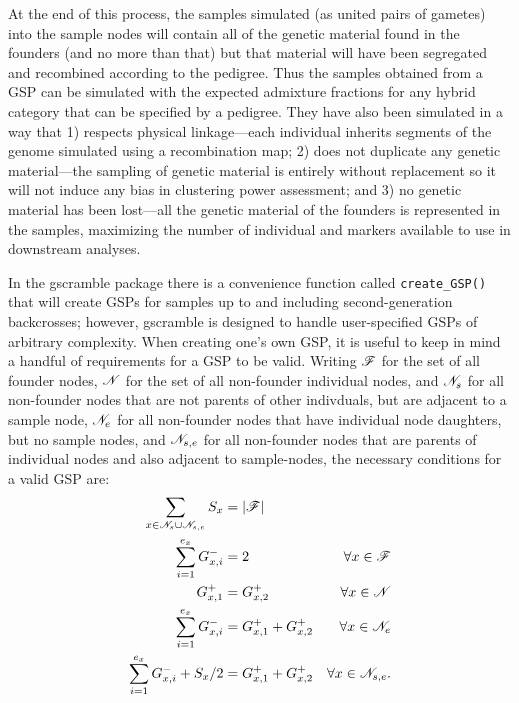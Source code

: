 At the end of this process, the samples simulated (as united pairs of gametes)
into the sample nodes will contain all of the genetic material found in the founders (and
no more than that)
but that material will have been segregated and recombined according to the pedigree.  Thus the
samples obtained from a GSP can be simulated with the expected admixture fractions
for any hybrid category that can be specified by a pedigree.  They have also been simulated
in a way that 1) respects physical linkage---each individual inherits segments of the genome
simulated using a recombination map; 2) does not duplicate any genetic material---the sampling of
genetic material is entirely without replacement so it will not induce any bias in clustering
power assessment; and 3) no genetic material has been lost---all the genetic material of the founders
is represented in the samples, maximizing the number of individual and markers available to
use in downstream analyses.

In the gscramble package there is a convenience function called {\footnotesize\tt create\_GSP()} that
will create GSPs for samples up to and including second-generation backcrosses; however, gscramble is designed
to handle user-specified GSPs of arbitrary complexity.  When creating one's own GSP, it is useful
to keep in mind a handful of requirements for a GSP to be valid. Writing $\mathscr{F}$ for the set of all founder nodes, $\mathscr{N}$ for the set of all non-founder individual nodes, and $\mathscr{N}_s$ for all non-founder
nodes that are not parents of other indivduals, but are adjacent to a sample node, $\mathscr{N}_e$ for all
non-founder nodes that have individual node daughters, but no sample nodes, and $\mathscr{N}_{s,e}$ for all
non-founder nodes that are parents of individual nodes and also adjacent to sample-nodes, the necessary conditions 
for a valid GSP are:
\begin{equation}
\begin{aligned}
\sum_{x \in \mathscr{N}_s \cup \mathscr{N}_{s,e}} S_x &= |\mathscr{F}|   \\ 
\sum_{i=1}^{e_x} G^-_{x,i} &= 2 & \forall x \in \mathscr{F} \\
G^+_{x,1} &= G^+_{x,2} & \forall x \in \mathscr{N} \\
\sum_{i=1}^{e_x} G^-_{x,i} &= G^+_{x,1} +  G^+_{x,2} & \forall x \in \mathscr{N}_e  \\ 
\sum_{i=1}^{e_x} G^-_{x,i} + S_x/2 &= G^+_{x,1} +  G^+_{x,2} & \forall x \in \mathscr{N}_{s,e}.  \\ 
\end{aligned}
\end{equation}




